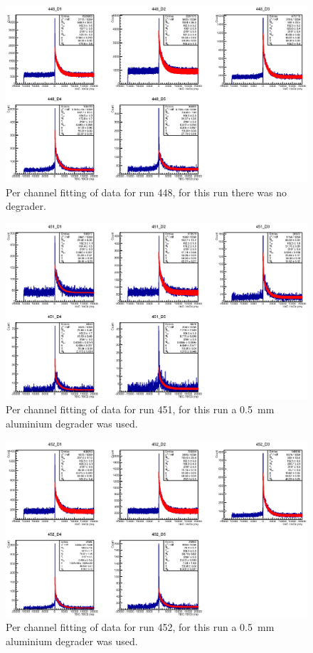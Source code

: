 \begin{figure}
    \centering
      \includegraphics[scale=1]{images/momentum_spectrum/448.eps}
    \caption{Per channel fitting of data for run 448, for this run there was no degrader.}
    \label{fig:images_momentum_spectrum_448}
\end{figure}
%
\begin{figure}
    \centering
      \includegraphics[scale=1]{images/momentum_spectrum/451.eps}
    \caption{Per channel fitting of data for run 451, for this run a 0.5~mm aluminium degrader was used.}
    \label{fig:images_momentum_spectrum_451}
\end{figure}
%
\begin{figure}
    \centering
      \includegraphics[scale=1]{images/momentum_spectrum/452.eps}
    \caption{Per channel fitting of data for run 452, for this run a 0.5~mm aluminium degrader was used.}
    \label{fig:images_momentum_spectrum_452}
\end{figure}
